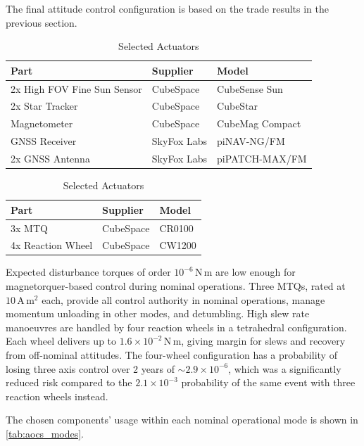 \documentclass[a4paper, 11pt, conference]{IEEEtran}
\begin{document}
The final attitude control configuration is based on the trade results in the previous section. 

\begin{table}[H]
\centering
\begin{minipage}[t]{0.47\textwidth}
\centering
\caption{Selected Sensors}
\begin{tabular}{l l l}
\hline
\textbf{Part} & \textbf{Supplier} & \textbf{Model} \\
\hline
2x High FOV Fine Sun Sensor & CubeSpace & CubeSense Sun \\
2x Star Tracker & CubeSpace & CubeStar \\
Magnetometer & CubeSpace & CubeMag Compact \\
GNSS Receiver & SkyFox Labs & piNAV-NG/FM \\
2x GNSS Antenna & SkyFox Labs & piPATCH-MAX/FM \\
\hline
\end{tabular}
\end{minipage}
\hfill
\begin{minipage}[t]{0.47\textwidth}
\centering
\caption{Selected Actuators}
\begin{tabular}{l l l}
\hline
\textbf{Part} & \textbf{Supplier} & \textbf{Model} \\
\hline
3x MTQ & CubeSpace & CR0100 \\
4x Reaction Wheel & CubeSpace & CW1200 \\
\hline
\end{tabular}
\end{minipage}
\end{table}



Expected disturbance torques of order $10^{-6}\,\mathrm{N\,m}$ are low enough for magnetorquer-based control during nominal operations. 
Three MTQs, rated at $10\,\mathrm{A\,m^2}$ each, provide all control authority in nominal operations, manage momentum unloading in other modes, and detumbling. High slew rate manoeuvres are handled by four reaction wheels in a tetrahedral configuration. Each wheel delivers up to $1.6\times10^{-2}\,\mathrm{N\,m}$, giving margin for slews and recovery from off-nominal attitudes. The four-wheel configuration has a probability of losing three axis control over 2 years of $\sim2.9\times10^{-6}$, which was a significantly reduced risk compared to the $2.1\times10^{-3}$ probability of the same event with three reaction wheels instead.

The chosen components' usage within each nominal operational mode is shown in \autoref{tab:aocs_modes}.
\end{document}
